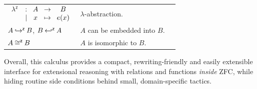 \begin{table}[t]
\begin{tabular}{lp{}p{}}
      $ \begin{array}{ccccc} \lambda^{\scriptscriptstyle{\mathsf{Z}}} & : & \!A\! & \to & \!B \\ & \mid & \!x\! & \mapsto & \!e(x) \end{array} $                         &
      $\lambda$-abstraction.                                        &
      \\

      $A \mathbin{\mathsf{\hookrightarrow}^{\mathsf{z}}} B$, $B \mathbin{\mathsf{\hookleftarrow}^{\mathsf{z}}} A$ &
      $A$ can be embedded into $B$.                                 &
      \\

      $A \mathbin{\mathsf{\cong}^{\mathsf{z}}} B$                                          &
      $A$ is isomorphic to $B$.                                     &
      \\
      \hline
    \end{tabular}
  \end{table}
\fi

Overall, this calculus provides a compact, rewriting-friendly and easily extensible interface for extensional reasoning with relations and functions \emph{inside} ZFC, while hiding routine side conditions behind small, domain-specific tactics.
